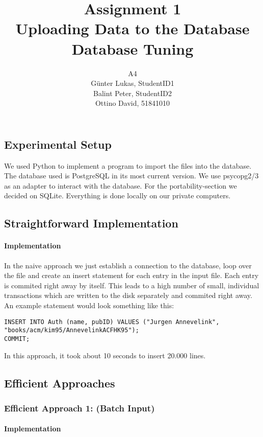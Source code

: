 \documentclass[11pt]{scrartcl}
\title{
  \textbf{\large Assignment 1} \\
  Uploading Data to the Database \\
  {\large Database Tuning}}
\author{
  A4 \\
  \large Günter Lukas, StudentID1 \\
  \large Balint Peter, StudentID2 \\
  \large Ottino David, 51841010
}
\begin{document}
\maketitle

\subsection*{Experimental Setup}

We used Python to implement a program to import the files into the database. The database used is PostgreSQL in its most current version. We use psycopg2/3 as an adapter to interact with the database. For the portability-section we decided on SQLite. Everything is done locally on our private computers.

\subsection*{Straightforward Implementation}

\paragraph{Implementation}

In the naive approach we just establish a connection to the database, loop over the file and create an insert statement for each entry in the input file. Each entry is commited right away by itself. This leads to a high number of small, individual transactions which are written to the disk separately and commited right away. An example statement would look something like this:

\begin{lstlisting}[style=dbtsql]
INSERT INTO Auth (name, pubID) VALUES ("Jurgen Annevelink", 
"books/acm/kim95/AnnevelinkACFHK95");
COMMIT;
\end{lstlisting}

In this approach, it took about 10 seconds to insert 20.000 lines.

\subsection*{Efficient Approaches}

\subsubsection*{Efficient Approach 1: (Batch Input)}

\paragraph{Implementation}
\end{document}
